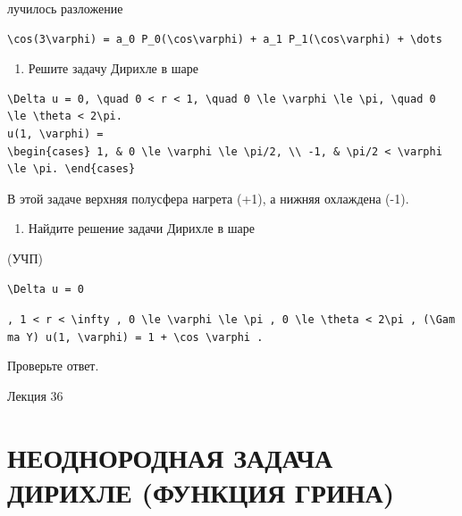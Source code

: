 \documentclass[
  ukrainian,
]{article}
\providecommand{\tightlist}{%
  \setlength{\itemsep}{0pt}\setlength{\parskip}{0pt}}
\begin{document}
лучилось разложение

\begin{verbatim}
\cos(3\varphi) = a_0 P_0(\cos\varphi) + a_1 P_1(\cos\varphi) + \dots
\end{verbatim}

\begin{enumerate}
\def\labelenumi{\arabic{enumi}.}
\setcounter{enumi}{4}
\tightlist
\item
  Решите задачу Дирихле в шаре
\end{enumerate}

\begin{verbatim}
\Delta u = 0, \quad 0 < r < 1, \quad 0 \le \varphi \le \pi, \quad 0 \le \theta < 2\pi.
u(1, \varphi) =
\begin{cases} 1, & 0 \le \varphi \le \pi/2, \\ -1, & \pi/2 < \varphi \le \pi. \end{cases}
\end{verbatim}

В этой задаче верхняя полусфера нагрета (+1), а нижняя охлаждена (-1).

\begin{enumerate}
\def\labelenumi{\arabic{enumi}.}
\setcounter{enumi}{5}
\tightlist
\item
  Найдите решение задачи Дирихле в шаре
\end{enumerate}

(УЧП)

\begin{verbatim}
\Delta u = 0
\end{verbatim}

\texttt{,\ \textquotesingle{}1\ \textless{}\ r\ \textless{}\ \textbackslash{}infty\textquotesingle{}\ ,\ \textquotesingle{}0\ \textbackslash{}le\ \textbackslash{}varphi\ \textbackslash{}le\ \textbackslash{}pi\textquotesingle{}\ ,\ \textquotesingle{}0\ \textbackslash{}le\ \textbackslash{}theta\ \textless{}\ 2\textbackslash{}pi\textquotesingle{}\ ,\ \textquotesingle{}(\textbackslash{}Gamma\ Y)\textquotesingle{}\ \textquotesingle{}u(1,\ \textbackslash{}varphi)\ =\ 1\ +\ \textbackslash{}cos\ \textbackslash{}varphi\textquotesingle{}\ .}

Проверьте ответ.

Лекция 36

\section{НЕОДНОРОДНАЯ ЗАДАЧА ДИРИХЛЕ (ФУНКЦИЯ
ГРИНА)}\label{ux43dux435ux43eux434ux43dux43eux440ux43eux434ux43dux430ux44f-ux437ux430ux434ux430ux447ux430-ux434ux438ux440ux438ux445ux43bux435-ux444ux443ux43dux43aux446ux438ux44f-ux433ux440ux438ux43dux430}
\end{document}
